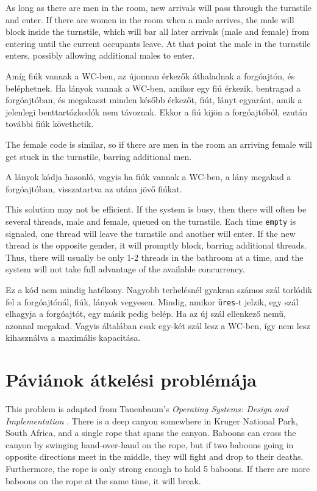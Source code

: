 \documentclass{book}
\begin{document}
As long as there are men in the room, new arrivals will pass
through the turnstile and enter.  If there are women in the room
when a male arrives, the male will block inside the turnstile,
which will bar all later arrivals (male and female) from entering
until the current occupants leave.  At that point the male in
the turnstile enters, possibly allowing additional males to enter.

Amíg fiúk vannak a WC-ben, az újonnan érkezők áthaladnak a
forgóajtón, és beléphetnek. Ha lányok vannak a WC-ben, amikor egy fiú
érkezik, bentragad a forgóajtóban, és megakaszt minden később
érkezőt, fiút, lányt egyaránt, amik a jelenlegi benttartózkodók nem távoznak.
Ekkor a fiú kijön a forgóajtóból, ezután további fiúk követhetik.

The female code is similar, so if there are men in the room an
arriving female will get stuck in the turnstile, barring additional
men.

A lányok kódja hasonló, vagyis ha fiúk vannak a WC-ben, a lány megakad
a forgóajtóban, visszatartva az utána jövő fiúkat.

This solution may not be efficient.  If
the system is busy, then there will often be several threads, male and
female, queued on the turnstile.  Each time {\tt empty} is signaled,
one thread will leave the turnstile and another will enter.  If the
new thread is the opposite gender, it will promptly block, barring
additional threads.  Thus, there will usually be only 1-2 threads in
the bathroom at a time, and the system will not take full advantage
of the available concurrency.

Ez a kód nem mindig hatékony. Nagyobb terhelésnél gyakran számos szál
torlódik fel a forgóajtónál, fiúk, lányok vegyesen. Mindig, amikor {\tt üres}-t
jelzik, egy szál elhagyja a forgóajtót, egy másik pedig belép. Ha az
új szál ellenkező nemű, azonnal megakad. Vagyis általában csak egy-két
szál lesz a WC-ben, így nem lesz kihasználva a maximális kapacitása.

\section{Páviánok átkelési problémája}

This problem is adapted from Tanenbaum's {\em Operating Systems:
Design and Implementation} \cite{tanenbaum}.
There is a deep canyon somewhere in
Kruger National Park, South Africa, and a single rope that spans the
canyon.  Baboons can cross the canyon by swinging hand-over-hand on
the rope, but if two baboons going in opposite directions meet in the
middle, they will fight and drop to their deaths.  Furthermore,
the rope is only strong enough to hold 5 baboons.  If there are
more baboons on the rope at the same time, it will break.
\end{document}
